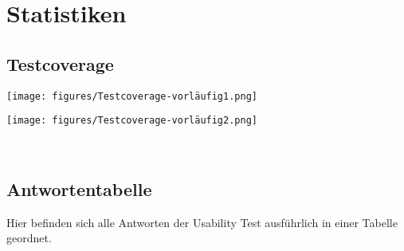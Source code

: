 \section{Statistiken}

\subsection{Testcoverage}

\texttt{[image: figures/Testcoverage-vorläufig1.png]}\par\vspace{1cm}
\texttt{[image: figures/Testcoverage-vorläufig2.png]}\par\vspace{1cm}
\\
\subsection{Antwortentabelle}

Hier befinden sich alle Antworten der Usability Test ausführlich in einer Tabelle geordnet.